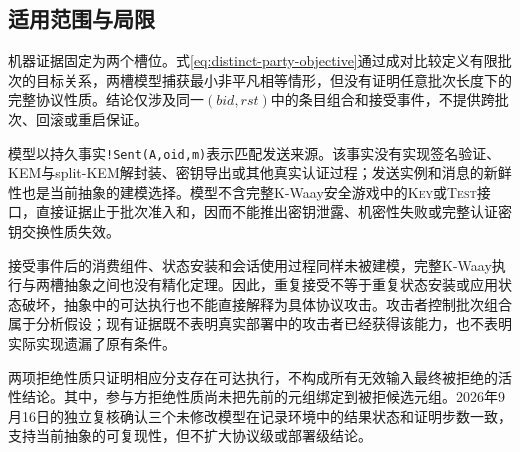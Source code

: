 \subsection{适用范围与局限}
\label{subsec:scope-limitations}

机器证据固定为两个槽位。式\eqref{eq:distinct-party-objective}通过成对比较定义有限批次的目标关系，两槽模型捕获最小非平凡相等情形，但没有证明任意批次长度下的完整协议性质。结论仅涉及同一$(\mathit{bid},\mathit{rst})$中的条目组合和接受事件，不提供跨批次、回滚或重启保证。

模型以持久事实\texttt{!Sent(A,oid,m)}表示匹配发送来源。该事实没有实现签名验证、KEM与split-KEM解封装、密钥导出或其他真实认证过程；发送实例和消息的新鲜性也是当前抽象的建模选择。模型不含完整K-Waay安全游戏中的\textsc{Key}或\textsc{Test}接口，直接证据止于批次准入和\receiveraccept，因而不能推出密钥泄露、机密性失败或完整认证密钥交换性质失效。

接受事件后的消费组件、状态安装和会话使用过程同样未被建模，完整K-Waay执行与两槽抽象之间也没有精化定理。因此，重复接受不等于重复状态安装或应用状态破坏，抽象中的可达执行也不能直接解释为具体协议攻击。攻击者控制批次组合属于分析假设；现有证据既不表明真实部署中的攻击者已经获得该能力，也不表明实际实现遗漏了原有条件。

两项拒绝性质只证明相应分支存在可达执行，不构成所有无效输入最终被拒绝的活性结论。其中，参与方拒绝性质尚未把先前的\sendaction 元组绑定到被拒候选元组。2026年9月16日的独立复核确认三个未修改模型在记录环境中的结果状态和证明步数一致，支持当前抽象的可复现性，但不扩大协议级或部署级结论。

